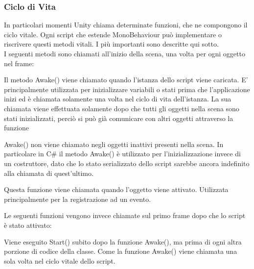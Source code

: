  \newpage
\subsubsection{Ciclo di Vita}
In particolari momenti Unity chiama determinate funzioni, che ne compongono il ciclo vitale. Ogni script che estende MonoBehaviour può implementare o riscrivere questi metodi vitali. I più importanti sono descritte qui sotto.\\
\newline
I seguenti metodi sono chiamati all'inizio della scena, una volta per ogni oggetto nel frame:

\begin{flushleft}
\begin{algorithmic}
\end{algorithmic}
Il metodo Awake() viene chiamato quando l'istanza dello script viene caricata.
E' principalmente utilizzata per inizializzare variabili o stati prima che l'applicazione inizi ed è chiamata solamente una volta nel ciclo di vita dell'istanza. La sua chiamata viene effettuata solamente dopo che tutti gli oggetti nella scena sono stati inizializzati, perciò si può già comunicare con altri oggetti attraverso la funzione \begin{algorithmic} \end{algorithmic} \vspace{0.4cm}
Awake() non viene chiamato negli oggetti inattivi presenti nella scena.
In particolare in C\# il metodo Awake() è utilizzato per l'inizializzazione invece di un costruttore, dato che lo stato serializzato dello script sarebbe ancora indefinito alla chiamata di quest'ultimo.
	
\end{flushleft}


\begin{flushleft}
	\begin{algorithmic}
	\end{algorithmic}
Questa funzione viene chiamata quando l'oggetto viene attivato. Utilizzata principalmente per la registrazione ad un evento.
	
\end{flushleft}


Le seguenti funzioni vengono invece chiamate sul primo frame dopo che lo script è stato attivato:
\begin{flushleft}
	\begin{algorithmic}
		\STATE{\textbf{Start()}}
	\end{algorithmic}
Viene eseguito Start() subito dopo la funzione Awake(), ma prima di ogni altra porzione di codice della classe. Come la funzione Awake() viene chiamata una sola volta nel ciclo vitale dello script.
\end{flushleft}


